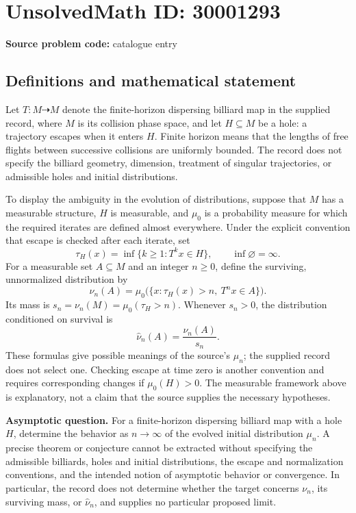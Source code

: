 \documentclass[11pt]{article}
\begin{document}
\section*{UnsolvedMath ID: 30001293}
\textbf{Source problem code:} catalogue entry
\subsection{Definitions and mathematical statement}
Let \(T\colon M\dashrightarrow M\) denote the finite-horizon dispersing billiard map in the supplied record, where \(M\) is its collision phase space, and let \(H\subseteq M\) be a hole: a trajectory escapes when it enters \(H\). Finite horizon means that the lengths of free flights between successive collisions are uniformly bounded. The record does not specify the billiard geometry, dimension, treatment of singular trajectories, or admissible holes and initial distributions.

To display the ambiguity in the evolution of distributions, suppose that \(M\) has a measurable structure, \(H\) is measurable, and \(\mu_0\) is a probability measure for which the required iterates are defined almost everywhere. Under the explicit convention that escape is checked after each iterate, set
\[
\tau_H(x)=\inf\{k\geq 1:T^k x\in H\},\qquad \inf\varnothing=\infty.
\]
For a measurable set \(A\subseteq M\) and an integer \(n\geq0\), define the surviving, unnormalized distribution by
\[
\nu_n(A)=\mu_0\bigl(\{x:\tau_H(x)>n,\ T^n x\in A\}\bigr).
\]
Its mass is \(s_n=\nu_n(M)=\mu_0(\tau_H>n)\). Whenever \(s_n>0\), the distribution conditioned on survival is
\[
\widehat\nu_n(A)=\frac{\nu_n(A)}{s_n}.
\]
These formulas give possible meanings of the source's \(\mu_n\); the supplied record does not select one. Checking escape at time zero is another convention and requires corresponding changes if \(\mu_0(H)>0\). The measurable framework above is explanatory, not a claim that the source supplies the necessary hypotheses.

\textbf{Asymptotic question.} For a finite-horizon dispersing billiard map with a hole \(H\), determine the behavior as \(n\to\infty\) of the evolved initial distribution \(\mu_n\). A precise theorem or conjecture cannot be extracted without specifying the admissible billiards, holes and initial distributions, the escape and normalization conventions, and the intended notion of asymptotic behavior or convergence. In particular, the record does not determine whether the target concerns \(\nu_n\), its surviving mass, or \(\widehat\nu_n\), and supplies no particular proposed limit.
\end{document}
